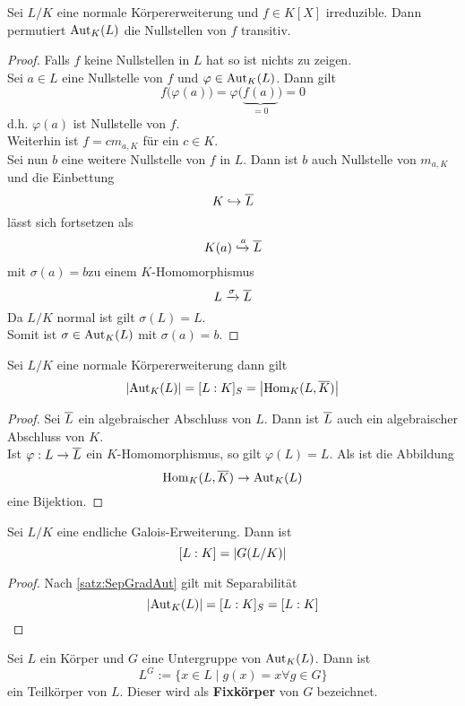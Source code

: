 
	\begin{satz}
		Sei $L/K$ eine normale Körpererweiterung und $f\in K[X]$ irreduzible. Dann permutiert $\operatorname{Aut}_K(L)$ die Nullstellen von $f$ transitiv.
	\end{satz}
	\begin{proof}
		Falls $f$ keine Nullstellen in $L$ hat so ist nichts zu zeigen.\\
		Sei $a\in L$ eine Nullstelle von $f$ und $\varphi\in\operatorname{Aut}_K(L)$. Dann gilt
		\[f\big(\varphi(a)\big)=\varphi\big(\underbrace{f(a)}_{=0}\big)=0\]
		d.h. $\varphi(a)$ ist Nullstelle von $f$.\\
		Weiterhin ist $f=cm_{a,K}$ für ein $c\in K$.\\
		Sei nun $b$ eine weitere Nullstelle von $f$ in $L$. Dann ist $b$ auch Nullstelle von $m_{a,K}$ und die Einbettung
		\[K\hookrightarrow \overline{L}\]
		lässt sich fortsetzen als
		\[K(a)\xhookrightarrow{a} \overline{L}\]
		mit $\sigma(a)=b$zu einem $K$-Homomorphismus
		\[L\xrightarrow{\sigma}\overline{L}\]
		Da $L/K$ normal ist gilt $\sigma(L)=L$.\\
		Somit ist $\sigma\in\operatorname{Aut}_K(L)$ mit $\sigma(a)=b$.
	\end{proof}

	\begin{satz}\label{satz:SepGradAut}
		Sei $L/K$ eine normale Körpererweiterung dann gilt\[\left|\operatorname{Aut}_K(L)\right|=[L:K]_S=\left|\operatorname{Hom}_K(L,\overline{K})\right|\]
	\end{satz}
	\begin{proof}
		Sei $\overline{L}$ ein algebraischer Abschluss von $L$. Dann ist $\overline{L}$ auch ein algebraischer Abschluss von $K$.\\
		Ist $\varphi:L\to\overline{L}$ ein $K$-Homomorphismus, so gilt $\varphi(L)=L$. Als ist die Abbildung
		\[\operatorname{Hom}_K(L,\overline{K})\to\operatorname{Aut}_K(L)\]
		eine Bijektion.
	\end{proof}
	
	\begin{satz}
		Sei $L/K$ eine endliche Galois-Erweiterung. Dann ist
		\[[L:K]=\left|G(L/K)\right|\]
	\end{satz}
	\begin{proof}
		Nach \ref{satz:SepGradAut} gilt mit Separabilität
		\[\left|\operatorname{Aut}_K(L)\right|=[L:K]_S=[L:K]\]
	\end{proof}

	\begin{definition}
		Sei $L$ ein Körper und $G$ eine Untergruppe von $\operatorname{Aut}_K(L)$. Dann ist
		\[L^G:=\{x\in L\mid g(x)=x\forall g\in G\}\]
		ein Teilkörper von $L$. Dieser wird als \textbf{Fixkörper} von $G$ bezeichnet.
	\end{definition}

